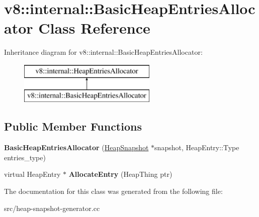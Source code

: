\hypertarget{classv8_1_1internal_1_1_basic_heap_entries_allocator}{}\section{v8\+:\+:internal\+:\+:Basic\+Heap\+Entries\+Allocator Class Reference}
\label{classv8_1_1internal_1_1_basic_heap_entries_allocator}
Inheritance diagram for v8\+:\+:internal\+:\+:Basic\+Heap\+Entries\+Allocator\+:\begin{figure}[H]
\begin{center}
\leavevmode
\includegraphics[height=2.000000cm]{classv8_1_1internal_1_1_basic_heap_entries_allocator}
\end{center}
\end{figure}
\subsection*{Public Member Functions}
\begin{DoxyCompactItemize}
\item 
\hypertarget{classv8_1_1internal_1_1_basic_heap_entries_allocator_a7a9fdb15588f5afce77f8794367f57ba}{}{\bfseries Basic\+Heap\+Entries\+Allocator} (\hyperlink{classv8_1_1internal_1_1_heap_snapshot}{Heap\+Snapshot} $\ast$snapshot, Heap\+Entry\+::\+Type entries\+\_\+type)\label{classv8_1_1internal_1_1_basic_heap_entries_allocator_a7a9fdb15588f5afce77f8794367f57ba}

\item 
\hypertarget{classv8_1_1internal_1_1_basic_heap_entries_allocator_a23cc88e3401573d35d129fc477a16018}{}virtual Heap\+Entry $\ast$ {\bfseries Allocate\+Entry} (Heap\+Thing ptr)\label{classv8_1_1internal_1_1_basic_heap_entries_allocator_a23cc88e3401573d35d129fc477a16018}

\end{DoxyCompactItemize}


The documentation for this class was generated from the following file\+:\begin{DoxyCompactItemize}
\item 
src/heap-\/snapshot-\/generator.\+cc\end{DoxyCompactItemize}
